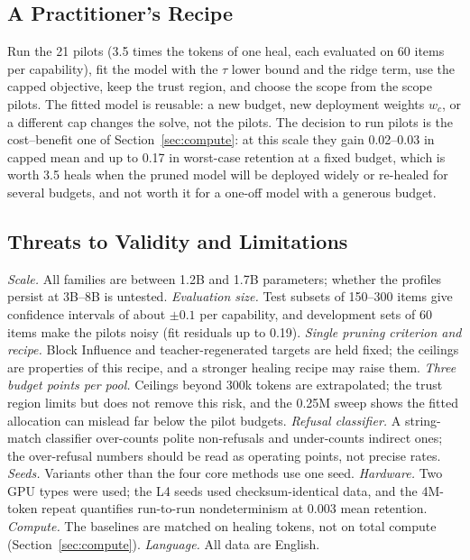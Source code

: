 \documentclass{ieeeaccess}
\begin{document}
\subsection{A Practitioner's Recipe}
Run the 21 pilots (3.5 times the tokens of one heal, each evaluated on 60 items per capability), fit the model with the $\tau$ lower bound and the ridge term, use the capped objective, keep the trust region, and choose the scope from the scope pilots. The fitted model is reusable: a new budget, new deployment weights $w_c$, or a different cap changes the solve, not the pilots. The decision to run pilots is the cost--benefit one of Section~\ref{sec:compute}: at this scale they gain 0.02--0.03 in capped mean and up to 0.17 in worst-case retention at a fixed budget, which is worth 3.5 heals when the pruned model will be deployed widely or re-healed for several budgets, and not worth it for a one-off model with a generous budget.

\subsection{Threats to Validity and Limitations}
\emph{Scale.} All families are between 1.2B and 1.7B parameters; whether the profiles persist at 3B--8B is untested. \emph{Evaluation size.} Test subsets of 150--300 items give confidence intervals of about $\pm0.1$ per capability, and development sets of 60 items make the pilots noisy (fit residuals up to 0.19). \emph{Single pruning criterion and recipe.} Block Influence and teacher-regenerated targets are held fixed; the ceilings are properties of this recipe, and a stronger healing recipe may raise them. \emph{Three budget points per pool.} Ceilings beyond 300k tokens are extrapolated; the trust region limits but does not remove this risk, and the 0.25M sweep shows the fitted allocation can mislead far below the pilot budgets. \emph{Refusal classifier.} A string-match classifier over-counts polite non-refusals and under-counts indirect ones; the over-refusal numbers should be read as operating points, not precise rates. \emph{Seeds.} Variants other than the four core methods use one seed. \emph{Hardware.} Two GPU types were used; the L4 seeds used checksum-identical data, and the 4M-token repeat quantifies run-to-run nondeterminism at 0.003 mean retention. \emph{Compute.} The baselines are matched on healing tokens, not on total compute (Section~\ref{sec:compute}). \emph{Language.} All data are English.

\end{document}
